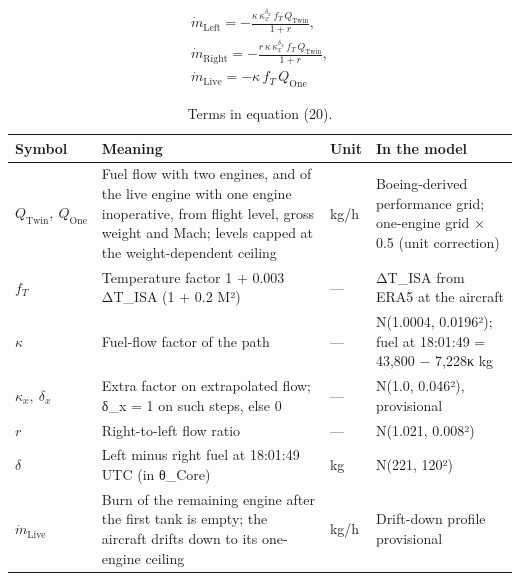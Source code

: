 \begin{multline}
\dot{m}_{\mathrm{Left}} = -\frac{\kappa\, \kappa_{x}^{\delta_{x}}\, f_{T}\, Q_{\mathrm{Twin}}}{1+r}, \\ \dot{m}_{\mathrm{Right}} = -\frac{r\, \kappa\, \kappa_{x}^{\delta_{x}}\, f_{T}\, Q_{\mathrm{Twin}}}{1+r}, \\ \dot{m}_{\mathrm{Live}} = -\kappa\, f_{T}\, Q_{\mathrm{One}}
\label{eq:20}
\end{multline}
\begin{table}[h]
\caption{Terms in equation (20).}
\small
\begin{tabular}{p{2.4cm}p{4.6cm}p{1.1cm}p{4.0cm}}
\hline
Symbol & Meaning & Unit & In the model \\
\hline
$Q_{\mathrm{Twin}},\ Q_{\mathrm{One}}$ & Fuel flow with two engines, and of the live engine with one engine inoperative, from flight level, gross weight and Mach; levels capped at the weight-dependent ceiling & kg/h & Boeing-derived performance grid; one-engine grid × 0.5 (unit correction) \\
$f_{T}$ & Temperature factor 1 + 0.003 ΔT\_ISA (1 + 0.2 M²) & — & ΔT\_ISA from ERA5 at the aircraft \\
$\kappa$ & Fuel-flow factor of the path & — & N(1.0004, 0.0196²); fuel at 18:01:49 = 43,800 − 7,228κ kg \\
$\kappa_{x},\ \delta_{x}$ & Extra factor on extrapolated flow; δ\_x = 1 on such steps, else 0 & — & N(1.0, 0.046²), provisional \\
$r$ & Right-to-left flow ratio & — & N(1.021, 0.008²) \\
$\delta$ & Left minus right fuel at 18:01:49 UTC (in θ\_Core) & kg & N(221, 120²) \\
$\dot{m}_{\mathrm{Live}}$ & Burn of the remaining engine after the first tank is empty; the aircraft drifts down to its one-engine ceiling & kg/h & Drift-down profile provisional \\
\hline
\end{tabular}
\end{table}

